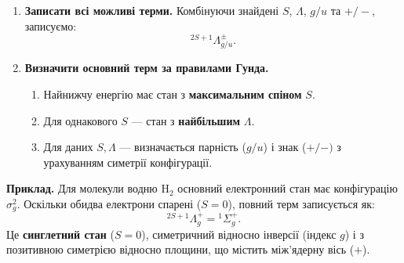 \begin{enumerate}
  \item \textbf{Записати всі можливі терми.}
  Комбінуючи знайдені $S$, $\Lambda$, $g/u$ та $+/-$, записуємо:
  \[
  {}^{2S+1}\Lambda_{g/u}^{\pm}.
  \]

  \item \textbf{Визначити основний терм за правилами Гунда.}
  \begin{enumerate}[label*=\arabic*.]
    \item Найнижчу енергію має стан з \textbf{максимальним спіном} $S$.
    \item Для однакового $S$ — стан з \textbf{найбільшим} $\Lambda$.
    \item Для даних $S, \Lambda$ — визначається парність ($g/u$) і знак ($+/-)$ з урахуванням симетрії конфігурації.
  \end{enumerate}
\end{enumerate}

\textbf{Приклад.}
Для молекули водню $\mathrm{H_2}$ основний електронний стан має конфігурацію $\sigma_g^2$.
Оскільки обидва електрони спарені ($S=0$), повний терм записується як:
\[
^{2S+1}\Lambda_g^+ = {}^1\Sigma_g^+.
\]
Це \textbf{синглетний стан} ($S=0$), симетричний відносно інверсії (індекс $g$) і з позитивною симетрією відносно площини, що містить між'ядерну вісь ($+$).

%
